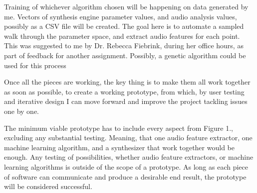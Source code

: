 Training of whichever algorithm chosen will be happening on data generated by
me. Vectors of synthesis engine parameter values, and audio analysis values,
possibly as a CSV file will be created. The goal here is to automate a sampled
walk through the parameter space, and extract audio features for each point.
This was suggested to me by Dr. Rebecca Fiebrink, during her office hours, as
part of feedback for another assignment. Possibly,  a genetic algorithm could be
used for this process

Once all the pieces are working, the key thing is to make them all work together as soon as possible, to create a working prototype, from which, by user testing and iterative design I can move forward and improve the project tackling issues one by one.

The minimum viable prototype has to include every aspect from Figure 1., excluding any substantial testing. Meaning, that one audio feature extractor, one machine learning algorithm, and a synthesizer that work together would be enough. Any testing of possibilities, whether audio feature extractors, or machine learning algorithms is outside of the scope of a prototype. As long as each piece of software can communicate and produce a desirable end result, the prototype will be considered successful.

